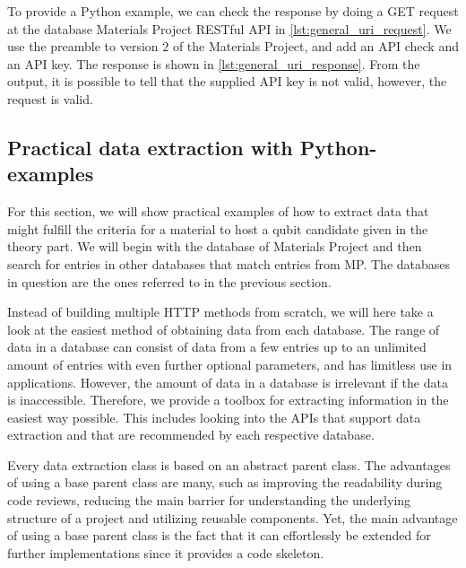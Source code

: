 To provide a Python example, we can check the response by doing a GET request at the database Materials Project RESTful API in \autoref{lst:general_uri_request}. We use the preamble to version $2$ of the Materials Project, and add an API check and an API key. The response is shown in \autoref{lst:general_uri_response}. From the output, it is possible to tell that the supplied API key is not valid, however, the request is valid.


\subsection{Practical data extraction with Python-examples}

For this section, we will show practical examples of how to extract data that might fulfill the criteria for a material to host a qubit candidate given in the theory part. We will begin with the database of Materials Project and then search for entries in other databases that match entries from MP. The databases in question are the ones referred to in the previous section.

Instead of building multiple HTTP methods from scratch, we will here take a look at the easiest method of obtaining data from each database. The range of data in a database can consist of data from a few entries up to an unlimited amount of entries with even further optional parameters, and has limitless use in applications. However, the amount of data in a database is irrelevant if the data is inaccessible. Therefore, we provide a toolbox for extracting information in the easiest way possible. This includes looking into the APIs that support data extraction and that are recommended by each respective database.



Every data extraction class is based on an abstract parent class. The advantages of using a base parent class are many, such as improving the readability during code reviews, reducing the main barrier for understanding the underlying structure of a project and utilizing reusable components. Yet, the main advantage of using a base parent class is the fact that it can effortlessly be extended for further implementations since it provides a code skeleton.


